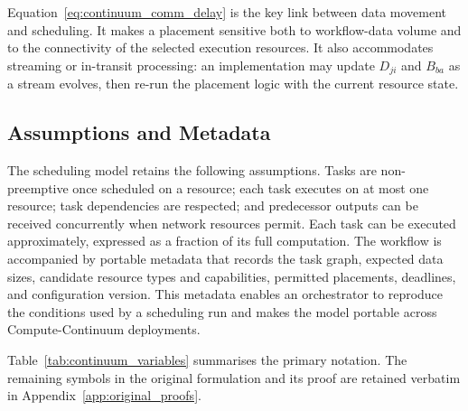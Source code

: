 Equation~\ref{eq:continuum_comm_delay} is the key link between data movement and scheduling. It makes a placement sensitive both to workflow-data volume and to the connectivity of the selected execution resources. It also accommodates streaming or in-transit processing: an implementation may update $D_{ji}$ and $B_{ba}$ as a stream evolves, then re-run the placement logic with the current resource state.

\subsection{Assumptions and Metadata}

The scheduling model retains the following assumptions. Tasks are non-preemptive once scheduled on a resource; each task executes on at most one resource; task dependencies are respected; and predecessor outputs can be received concurrently when network resources permit. Each task can be executed approximately, expressed as a fraction of its full computation. The workflow is accompanied by portable metadata that records the task graph, expected data sizes, candidate resource types and capabilities, permitted placements, deadlines, and configuration version. This metadata enables an orchestrator to reproduce the conditions used by a scheduling run and makes the model portable across Compute-Continuum deployments.

Table~\ref{tab:continuum_variables} summarises the primary notation. The remaining symbols in the original formulation and its proof are retained verbatim in Appendix~\ref{app:original_proofs}.

